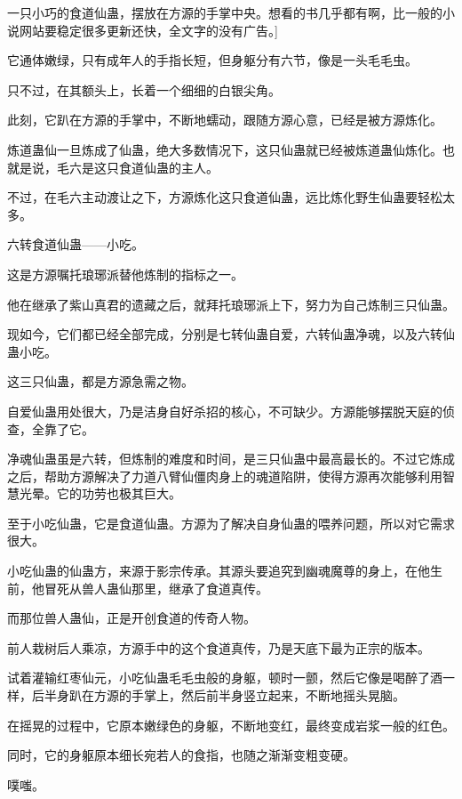 
\begin{this_body}

一只小巧的食道仙蛊，摆放在方源的手掌中央。想看的书几乎都有啊，比一般的小说网站要稳定很多更新还快，全文字的没有广告。]

它通体嫩绿，只有成年人的手指长短，但身躯分有六节，像是一头毛毛虫。

只不过，在其额头上，长着一个细细的白银尖角。

此刻，它趴在方源的手掌中，不断地蠕动，跟随方源心意，已经是被方源炼化。

炼道蛊仙一旦炼成了仙蛊，绝大多数情况下，这只仙蛊就已经被炼道蛊仙炼化。也就是说，毛六是这只食道仙蛊的主人。

不过，在毛六主动渡让之下，方源炼化这只食道仙蛊，远比炼化野生仙蛊要轻松太多。

六转食道仙蛊——小吃。

这是方源嘱托琅琊派替他炼制的指标之一。

他在继承了紫山真君的遗藏之后，就拜托琅琊派上下，努力为自己炼制三只仙蛊。

现如今，它们都已经全部完成，分别是七转仙蛊自爱，六转仙蛊净魂，以及六转仙蛊小吃。

这三只仙蛊，都是方源急需之物。

自爱仙蛊用处很大，乃是洁身自好杀招的核心，不可缺少。方源能够摆脱天庭的侦查，全靠了它。

净魂仙蛊虽是六转，但炼制的难度和时间，是三只仙蛊中最高最长的。不过它炼成之后，帮助方源解决了力道八臂仙僵肉身上的魂道陷阱，使得方源再次能够利用智慧光晕。它的功劳也极其巨大。

至于小吃仙蛊，它是食道仙蛊。方源为了解决自身仙蛊的喂养问题，所以对它需求很大。

小吃仙蛊的仙蛊方，来源于影宗传承。其源头要追究到幽魂魔尊的身上，在他生前，他冒死从兽人蛊仙那里，继承了食道真传。

而那位兽人蛊仙，正是开创食道的传奇人物。

前人栽树后人乘凉，方源手中的这个食道真传，乃是天底下最为正宗的版本。

试着灌输红枣仙元，小吃仙蛊毛毛虫般的身躯，顿时一颤，然后它像是喝醉了酒一样，后半身趴在方源的手掌上，然后前半身竖立起来，不断地摇头晃脑。

在摇晃的过程中，它原本嫩绿色的身躯，不断地变红，最终变成岩浆一般的红色。

同时，它的身躯原本细长宛若人的食指，也随之渐渐变粗变硬。

噗嗤。


\end{this_body}
